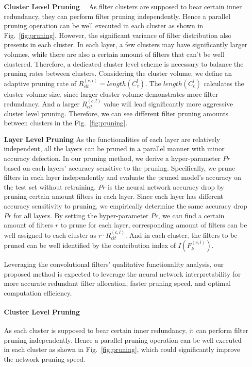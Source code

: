 \documentclass{article} %
\begin{document}
\textbf{Cluster Level Pruning}
~~As filter clusters are supposed to bear certain inner redundancy, they can perform filter pruning independently.
	Hence a parallel pruning operation can be well executed in each cluster as shown in Fig.~\ref{fig:pruning}.
However, the significant variance of filter distribution also presents in each cluster.
	In each layer, a few clusters may have significantly larger volumes, while there are also a certain amount of filters that can't be well clustered.
	Therefore, a dedicated cluster level scheme is necessary to balance the pruning rates between clusters.
	Considering the cluster volume, we define an adaptive pruning rate of $R_{clt}^{(c,l)}= length(C_c^l)$.
	The $length(C_c^l)$ calculates the cluster volume size, since larger cluster volume demonstrates more filter redundancy.
	And a larger $R_{clt}^{(c,l)}$ value will lead significantly more aggressive cluster level pruning.
	Therefore, we can see different filter pruning amounts between clusters in the Fig.~\ref{fig:pruning}.

\textbf{Layer Level Pruning}%
	As the functionalities of each layer are relatively independent, all the layers can be pruned in a parallel manner with minor accuracy defection.
	In our pruning method, we derive a hyper-parameter $Pr$ based on each layers' accuracy sensitive to the pruning.
	Specifically, we prune filters in each layer independently and evaluate the pruned model's accuracy on the test set without retraining.
	$Pr$ is the neural network accuracy drop by pruning certain amount filters in each layer.
	Since each layer has different accuracy sensitivity to pruning, we empirically determine the same accuracy drop $Pr$ for all layers.
	By setting the hyper-parameter $Pr$, we can find a certain amount of filters $r$ to prune for each layer, corresponding amount of filters can be well assigned to each cluster as $r\cdot R_{clt}^{(c,l)}$.
	And in each cluster, the filters to be pruned can be well identified by the contribution index of $I(F_k^{(c,l)})$.

	Leveraging the convolutional filters' qualitative functionality analysis, our proposed method is expected to leverage the neural network interpretability for more accurate redundant filter allocation, faster pruning speed, and optimal computation efficiency.
\paragraph{Cluster Level Pruning}
As each cluster is supposed to bear certain inner redundancy, it can perform filter pruning independently.
	Hence a parallel pruning operation can be well executed in each cluster as shown in Fig.~\ref{fig:pruning}, which could significantly improve the network pruning speed.
\end{document}
